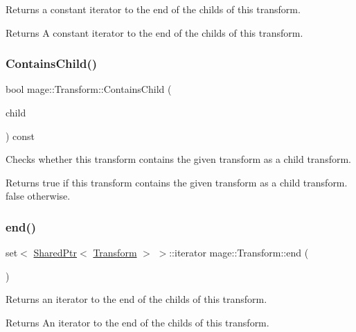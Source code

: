 Returns a constant iterator to the end of the childs of this transform.

\begin{DoxyReturn}{Returns}
A constant iterator to the end of the childs of this transform. 
\end{DoxyReturn}
\hypertarget{structmage_1_1_transform_a5a37f49cfb1f631ee580f368f8f84d87}{}\label{structmage_1_1_transform_a5a37f49cfb1f631ee580f368f8f84d87} 
\subsubsection{\texorpdfstring{Contains\+Child()}{ContainsChild()}}
{\footnotesize\ttfamily bool mage\+::\+Transform\+::\+Contains\+Child (\begin{DoxyParamCaption}\item[{const \hyperlink{namespacemage_a1e01ae66713838a7a67d30e44c67703e}{Shared\+Ptr}$<$ \hyperlink{structmage_1_1_transform}{Transform} $>$}]{child }\end{DoxyParamCaption}) const}

Checks whether this transform contains the given transform as a child transform.

\begin{DoxyReturn}{Returns}
{\ttfamily true} if this transform contains the given transform as a child transform. {\ttfamily false} otherwise. 
\end{DoxyReturn}
\hypertarget{structmage_1_1_transform_ae164a6f43283fa98ca3bd13779b1ebd1}{}\label{structmage_1_1_transform_ae164a6f43283fa98ca3bd13779b1ebd1} 
\subsubsection{\texorpdfstring{end()}{end()}}
{\footnotesize\ttfamily set$<$ \hyperlink{namespacemage_a1e01ae66713838a7a67d30e44c67703e}{Shared\+Ptr}$<$ \hyperlink{structmage_1_1_transform}{Transform} $>$ $>$\+::iterator mage\+::\+Transform\+::end (\begin{DoxyParamCaption}{ }\end{DoxyParamCaption})}

Returns an iterator to the end of the childs of this transform.

\begin{DoxyReturn}{Returns}
An iterator to the end of the childs of this transform. 
\end{DoxyReturn}
\hypertarget{structmage_1_1_transform_a12e7ee212a9270fb3f01de9b7f5ee3b8}{}\label{structmage_1_1_transform_a12e7ee212a9270fb3f01de9b7f5ee3b8} 
